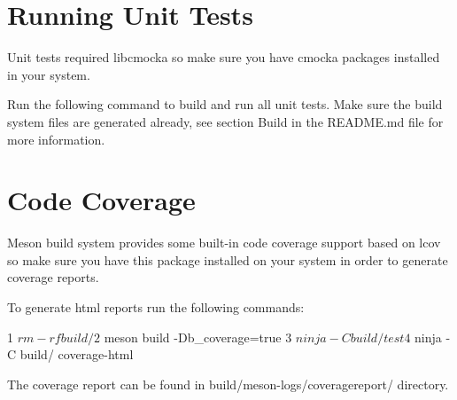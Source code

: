 \section*{Running Unit Tests}

Unit tests required libcmocka so make sure you have cmocka packages installed in your system.

Run the following command to build and run all unit tests. Make sure the build system files are generated already, see section \textquotesingle{}Build\textquotesingle{} in the R\+E\+A\+D\+M\+E.\+md file for more information.




\section*{Code Coverage}

Meson build system provides some built-\/in code coverage support based on {\ttfamily lcov} so make sure you have this package installed on your system in order to generate coverage reports.

To generate html reports run the following commands\+:


\begin{DoxyCode}
1 $ rm -rf build/
2 $ meson build -Db\_coverage=true
3 $ ninja -C build/ test
4 $ ninja -C build/ coverage-html
\end{DoxyCode}


The coverage report can be found in build/meson-\/logs/coveragereport/ directory. 